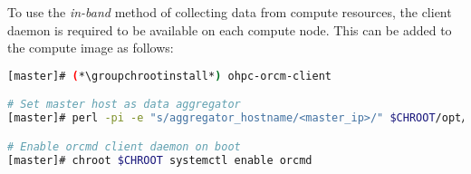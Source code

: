 To use the {\em in-band} method of collecting data from compute resources, the
\ORCM{} client daemon is required to be available on each compute node. This can
be added to the compute image as follows:

\begin{lstlisting}[language=bash,keywords={},upquote=true]
[master]# (*\groupchrootinstall*) ohpc-orcm-client

# Set master host as data aggregator
[master]# perl -pi -e "s/aggregator_hostname/<master_ip>/" $CHROOT/opt/open-rcm/etc/orcm-site.xml

# Enable orcmd client daemon on boot
[master]# chroot $CHROOT systemctl enable orcmd
\end{lstlisting}
